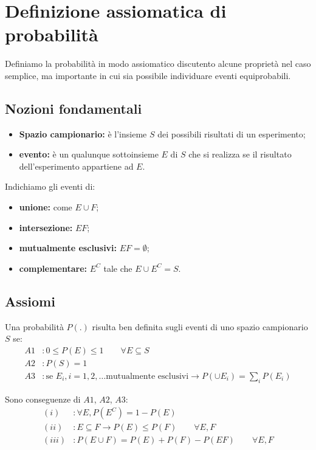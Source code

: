 \section{Definizione assiomatica di probabilità}%
\label{sec:Definizione assiomatica di probabilità}
Definiamo la probabilità in modo assiomatico discutento alcune proprietà nel
caso semplice, ma importante in cui sia possibile individuare eventi
equiprobabili.

\subsection{Nozioni fondamentali}%
\label{sub:Nozioni fondamentali}
\begin{itemize}
  \item \textbf{Spazio campionario:} è l'insieme $S$ dei possibili risultati di
    un esperimento;
  \item \textbf{evento:} è un qualunque sottoinsieme $E$ di $S$ che si realizza
    se il risultato dell'esperimento appartiene ad $E$.
\end{itemize}

Indichiamo gli eventi di:
\begin{itemize}
  \item \textbf{unione:} come $E\cup F$;
  \item \textbf{intersezione:} $EF$;
  \item \textbf{mutualmente esclusivi:} $EF=\emptyset$;
  \item \textbf{complementare:} $E^C$ tale che $E\cup E^C=S$.
\end{itemize}

\subsection{Assiomi}%
\label{sub:Assiomi}
Una probabilità $P(.)$ risulta ben definita sugli eventi di uno spazio
campionario $S$ se:
\begin{equation}
  \begin{split}
    A1&:0\leq P(E)\leq1\qquad\forall E\subseteq S\\
    A2&:P(S)=1\\
    A3&: \text{se }E_i,i=1,2,\dots \text{mutualmente esclusivi}\rightarrow
    P(\cup E_i)=\sum_i P(E_i)
  \end{split}
\end{equation}

Sono conseguenze di $A1$, $A2$, $A3$:
\begin{equation}
  \begin{split}
    (i)&:\forall E,P(E^C)=1-P(E)\\
    (ii)&:E\subseteq F\rightarrow P(E)\leq P(F)\qquad\forall E,F\\
    (iii)&: P(E\cup F)=P(E)+P(F)-P(EF)\qquad\forall E,F
  \end{split}
\end{equation}

